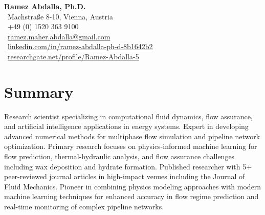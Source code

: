 \documentclass[a4paper,10pt]{article}
\begin{document}
\begin{center}
    {\LARGE \textbf{Ramez Abdalla, Ph.D.}}\\
    \vspace{2mm}
    \faMapMarker \, Machstraße 8-10, Vienna, Austria \\
    \faPhone \, +49 (0) 1520 363 9100 \\
    \faEnvelope \, \href{mailto:rmz.aziz@gmail.com}{ramez.maher.abdalla@gmail.com} \\
    \faLinkedin \, \href{    https://www.linkedin.com/in/ramez-abdalla-ph-d-8b1642b2/}
    {linkedin.com/in/ramez-abdalla-ph-d-8b1642b2} \\
    \faResearchgate \, \href{https://www.researchgate.net/profile/Ramez-Abdalla-5}{researchgate.net/profile/Ramez-Abdalla-5}
\end{center}

\vspace{2mm}

\section*{Summary}
Research scientist specializing in computational fluid dynamics, flow assurance, and artificial intelligence applications in energy systems. Expert in developing advanced numerical methods for multiphase flow simulation and pipeline network optimization. Primary research focuses on physics-informed machine learning for flow prediction, thermal-hydraulic analysis, and flow assurance challenges including wax deposition and hydrate formation. Published researcher with 5+ peer-reviewed journal articles in high-impact venues including the Journal of Fluid Mechanics. Pioneer in combining physics modeling approaches with modern machine learning techniques for enhanced accuracy in flow regime prediction and real-time monitoring of complex pipeline networks.
\end{document}
